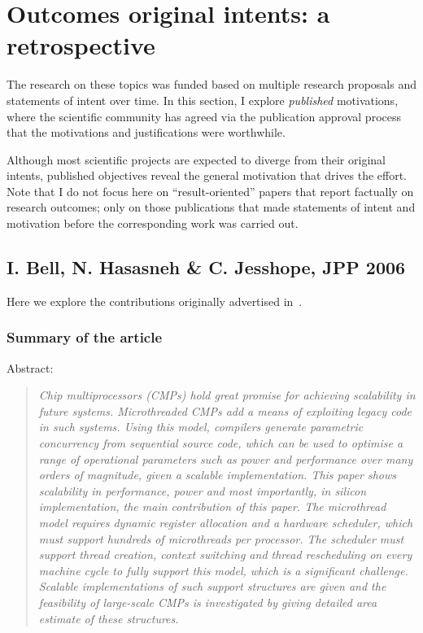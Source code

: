 \chapter{Outcomes \vs original intents: a retrospective}
\label{chap:outcomes}

The research on these topics was funded based on multiple research
proposals and statements of intent over time. In this section, I
explore \emph{published} motivations, where the scientific community has
agreed via the publication approval process that the motivations and
justifications were worthwhile.
 
Although most scientific projects are expected to diverge from their
original intents, published objectives reveal the general motivation
that drives the effort. Note that I do not focus here on
``result-oriented'' papers that report factually on research outcomes;
only on those publications that made statements of intent and
motivation before the corresponding work was carried out.

\section{I. Bell, N. Hasasneh \& C. Jesshope, JPP 2006}

Here we explore the contributions originally advertised in~\cite{bell.06.jpp}.

\subsection{Summary of the article}

Abstract:
\begin{quote}
\itshape Chip multiprocessors (CMPs) hold great promise for achieving
scalability in future systems. Microthreaded CMPs add a means of
exploiting legacy code in such systems. Using this model, compilers
generate parametric concurrency from sequential source code, which
can be used to optimise a range of operational parameters such as
power and performance over many orders of magnitude, given a scalable
implementation. This paper shows scalability in performance, power
and most importantly, in silicon implementation, the main contribution
of this paper. The microthread model requires dynamic register
allocation and a hardware scheduler, which must support hundreds of
microthreads per processor. The scheduler must support thread
creation, context switching and thread rescheduling on every machine
cycle to fully support this model, which is a significant
challenge. Scalable implementations of such support structures are
given and the feasibility of large-scale CMPs is investigated by
giving detailed area estimate of these structures.
\end{quote}


